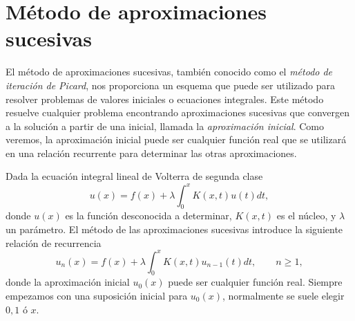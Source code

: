 \section{Método de aproximaciones sucesivas}
El método de aproximaciones sucesivas, también conocido como el \textit{método de iteración de Picard}, nos proporciona un esquema que puede ser utilizado para resolver problemas de valores iniciales o ecuaciones integrales. Este método resuelve cualquier problema encontrando aproximaciones sucesivas que convergen a la solución a partir de una inicial, llamada la \textit{aproximación inicial}. Como veremos, la aproximación inicial puede ser cualquier función real que se utilizará en una relación recurrente para determinar las otras aproximaciones.

Dada la ecuación integral lineal de Volterra de segunda clase
\begin{equation}
	u(x) = f(x) + \lambda \int_{0}^{x} K(x,t)u(t)dt,
\end{equation}
donde $u(x)$ es la función desconocida a determinar, $K(x,t)$ es el núcleo, y $\lambda$ un parámetro. El método de las aproximaciones sucesivas introduce la siguiente relación de recurrencia
\begin{equation}\label{eq:aprox1}
	u_n(x) = f(x) + \lambda \int_{0}^{x} K(x,t)u_{n-1}(t)dt, \qquad n \geqslant 1,
\end{equation}
donde la aproximación inicial $u_0(x)$ puede ser cualquier función real. Siempre empezamos con una suposición inicial para $u_0(x)$, normalmente se suele elegir $0, 1$ ó $x$.

